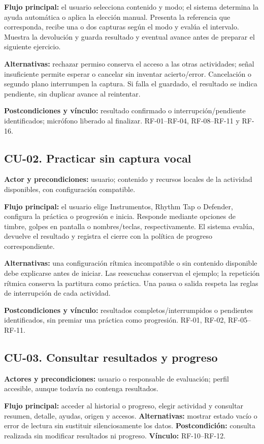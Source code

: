 \textbf{Flujo principal:} el usuario selecciona contenido y modo; el sistema
determina la ayuda automática o aplica la elección manual. Presenta la referencia
que corresponda, recibe una o dos capturas según el modo y evalúa el intervalo.
Muestra la devolución y guarda resultado y eventual avance antes de preparar
el siguiente ejercicio.

\textbf{Alternativas:} rechazar permiso conserva el acceso a las otras actividades;
señal insuficiente permite esperar o cancelar sin inventar acierto/error.
Cancelación o segundo plano interrumpen la captura. Si falla el guardado, el
resultado se indica pendiente, sin duplicar avance al reintentar.

\textbf{Postcondiciones y vínculo:} resultado confirmado o interrupción/pendiente
identificados; micrófono liberado al finalizar. RF-01--RF-04, RF-08--RF-11 y RF-16.

\subsection{CU-02. Practicar sin captura vocal}
\textbf{Actor y precondiciones:} usuario; contenido y recursos locales de la
actividad disponibles, con configuración compatible.

\textbf{Flujo principal:} el usuario elige Instrumentos, Rhythm Tap o Defender,
configura la práctica o progresión e inicia. Responde mediante opciones de timbre,
golpes en pantalla o nombres/teclas, respectivamente. El sistema evalúa, devuelve
el resultado y registra el cierre con la política de progreso correspondiente.

\textbf{Alternativas:} una configuración rítmica incompatible o sin contenido
disponible debe explicarse antes de iniciar. Las reescuchas conservan el ejemplo;
la repetición rítmica conserva la partitura como práctica. Una pausa o salida
respeta las reglas de interrupción de cada actividad.

\textbf{Postcondiciones y vínculo:} resultados completos/interrumpidos o pendientes
identificados, sin premiar una práctica como progresión. RF-01, RF-02, RF-05--RF-11.

\subsection{CU-03. Consultar resultados y progreso}
\textbf{Actores y precondiciones:} usuario o responsable de evaluación; perfil
accesible, aunque todavía no contenga resultados.

\textbf{Flujo principal:} acceder al historial o progreso, elegir actividad y
consultar resumen, detalle, ayudas, origen y accesos. \textbf{Alternativas:}
mostrar estado vacío o error de lectura sin sustituir silenciosamente los datos.
\textbf{Postcondición:} consulta realizada sin modificar resultados ni progreso.
\textbf{Vínculo:} RF-10--RF-12.

